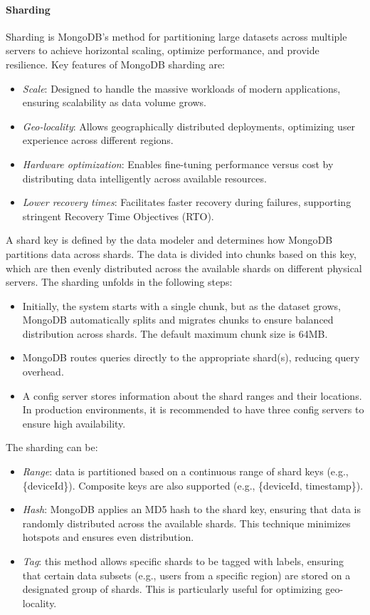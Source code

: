 \paragraph*{Sharding}
Sharding is MongoDB's method for partitioning large datasets across multiple servers to achieve horizontal scaling, optimize performance, and provide resilience.
Key features of MongoDB sharding are:
\begin{itemize} 
    \item \textit{Scale}: Designed to handle the massive workloads of modern applications, ensuring scalability as data volume grows. 
    \item \textit{Geo-locality}: Allows geographically distributed deployments, optimizing user experience across different regions. 
    \item \textit{Hardware optimization}: Enables fine-tuning performance versus cost by distributing data intelligently across available resources. 
    \item \textit{Lower recovery times}: Facilitates faster recovery during failures, supporting stringent Recovery Time Objectives (RTO). 
\end{itemize}
A shard key is defined by the data modeler and determines how MongoDB partitions data across shards. 
The data is divided into chunks based on this key, which are then evenly distributed across the available shards on different physical servers.
The sharding unfolds in the following steps:
\begin{itemize} 
    \item Initially, the system starts with a single chunk, but as the dataset grows, MongoDB automatically splits and migrates chunks to ensure balanced distribution across shards. 
        The default maximum chunk size is 64MB. 
    \item MongoDB routes queries directly to the appropriate shard(s), reducing query overhead. 
    \item A config server stores information about the shard ranges and their locations. 
        In production environments, it is recommended to have three config servers to ensure high availability. 
\end{itemize}
The sharding can be: 
\begin{itemize}
    \item \textit{Range}: data is partitioned based on a continuous range of shard keys (e.g., \{deviceId\}). Composite keys are also supported (e.g., \{deviceId, timestamp\}).
    \item \textit{Hash}: MongoDB applies an MD5 hash to the shard key, ensuring that data is randomly distributed across the available shards. 
        This technique minimizes hotspots and ensures even distribution.
    \item \textit{Tag}: this method allows specific shards to be tagged with labels, ensuring that certain data subsets (e.g., users from a specific region) are stored on a designated group of shards. 
        This is particularly useful for optimizing geo-locality.
\end{itemize}
